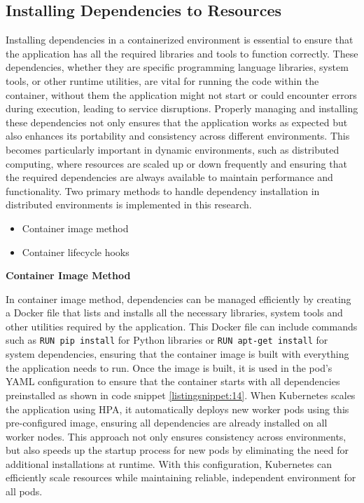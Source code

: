 \subsection{Installing Dependencies to Resources}



Installing dependencies in a containerized environment is essential to ensure that the application has all the required libraries and tools to function correctly. These dependencies, whether they are specific programming language libraries, system tools, or other runtime utilities, are vital for running the code within the container, without them the application might not start or could encounter errors during execution, leading to service disruptions. Properly managing and installing these dependencies not only ensures that the application works as expected but also enhances its portability and consistency across different environments. This becomes particularly important in dynamic environments, such as distributed computing, where resources are scaled up or down frequently and ensuring that the required dependencies are always available to maintain performance and functionality. Two primary methods to handle dependency installation in distributed environments is implemented in this research. \cite{Kubernetes_doc, loft2024adding}

\begin{itemize}
    \item Container image method
    \item Container lifecycle hooks
\end{itemize}

\textbf{Container Image Method}

In container image method, dependencies can be managed efficiently by creating a Docker file that lists and installs all the necessary libraries, system tools and other utilities required by the application. This Docker file can include commands such as \texttt{RUN pip install} for Python libraries or \texttt{RUN apt-get install} for system dependencies, ensuring that the container image is built with everything the application needs to run. Once the image is built, it is used in the pod's YAML configuration to ensure that the container starts with all dependencies preinstalled as shown in code snippet \autoref{listingsnippet:14}. When Kubernetes scales the application using HPA, it automatically deploys new worker pods using this pre-configured image, ensuring all dependencies are already installed on all worker nodes. This approach not only ensures consistency across environments, but also speeds up the startup process for new pods by eliminating the need for additional installations at runtime. With this configuration, Kubernetes can efficiently scale resources while maintaining reliable, independent environment for all pods. \cite{Kubernetes_doc, loft2024adding}

